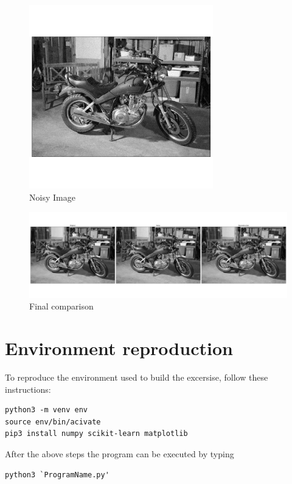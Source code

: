 \documentclass{article}
\begin{document}
\begin{figure}[H]
      \includegraphics[width=8cm]{assets/Noisy.png}
      \centering
      \caption{Noisy Image}
\end{figure}

\begin{figure}[H]
      \includegraphics[width=16cm]{assets/FinalComparison.png}
      \centering
      \caption{Final comparison}
\end{figure}

\section {Environment reproduction}
To reproduce the environment used to build the excersise, follow these instructions:

\begin{verbatim}
python3 -m venv env
source env/bin/acivate
pip3 install numpy scikit-learn matplotlib
\end{verbatim}

After the above steps the program can be executed by typing

\begin{verbatim}
python3 `ProgramName.py'
\end{verbatim}



\end{document}
